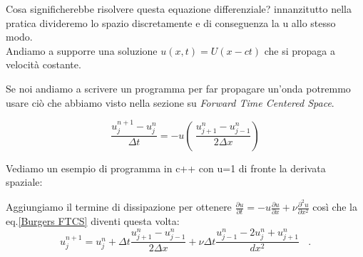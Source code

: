 \documentclass{article}
\begin{document}
	Cosa significherebbe risolvere questa equazione differenziale? innanzitutto nella pratica divideremo lo spazio discretamente e di conseguenza la u allo stesso modo.\\
	Andiamo a supporre una soluzione $u(x, t) = U(x-ct)$ che si propaga a velocità costante.
	
	Se noi andiamo a scrivere un programma per far propagare un'onda potremmo usare ciò che abbiamo visto nella sezione su \emph{Forward Time Centered Space}.
	
	\[\frac{u_j^{n+1} - u_j^{n}}{\Delta t} = -u\left(\ \frac{u_{j+1}^{n} - u_{j-1}^{n}}{2\Delta x}\right)\]
	
	Vediamo un esempio di programma in c++ con u=1 di fronte la derivata spaziale:
	
	
	
	Aggiungiamo il termine di dissipazione per ottenere $\boxed{\frac{\partial u}{\partial t} = - u \frac{\partial u}{\partial x} + \nu \frac{\partial^2 u}{\partial x^2}}$ così che la eq.\ref{Burgers FTCS} diventi questa volta:
	\[
	u^{n+1}_j = u^n_j + \Delta t \frac{u_{j+1}^{n} - u_{j-1}^{n}}{2\Delta x} + \nu \Delta t \frac{u_{j-1}^n -2u_j^n + u_{j+1}^n}{dx^2}  \ \ \ \ .
	\]
	
	
	
	
	
	
\end{document}
